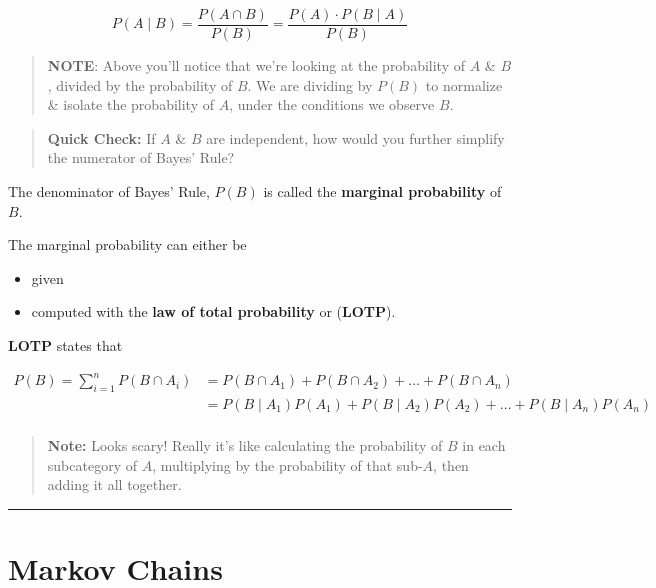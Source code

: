 \documentclass[
]{book}
\providecommand{\tightlist}{%
  \setlength{\itemsep}{0pt}\setlength{\parskip}{0pt}}
\begin{document}
\[P(A \mid B) = \frac{P(A \cap B)}{P(B)}=\frac{P(A)\cdot P(B \mid A)}{P(B)}\]

\begin{quote}
\textbf{NOTE}: Above you'll notice that we're looking at the probability of \(A\) \& \(B\), divided by the probability of \(B\). We are dividing by \(P(B)\) to normalize \& isolate the probability of \(A\), under the conditions we observe \(B\).
\end{quote}

\begin{quote}
\textbf{Quick Check:} If \(A\) \& \(B\) are independent, how would you further simplify the numerator of Bayes' Rule?
\end{quote}

The denominator of Bayes' Rule, \(P(B)\) is called the \textbf{marginal probability} of \(B\).

The marginal probability can either be

\begin{itemize}
\tightlist
\item
  given
\item
  computed with the \textbf{law of total probability} or (\textbf{LOTP}).
\end{itemize}

\textbf{LOTP} states that

\begin{align*}
P(B) = \sum_{i=1}^n P(B \cap A_i) &= P(B \cap A_1) + P(B\cap A_2) + \dots + P(B\cap A_n) \\
&= P(B \mid A_1)P(A_1) + P(B\mid A_2)P(A_2) + \dots + P(B\mid A_n)P(A_n) \\
\end{align*}

\begin{quote}
\textbf{Note:} Looks scary! Really it's like calculating the probability of \(B\) in each subcategory of \(A\), multiplying by the probability of that sub-\(A\), then adding it all together.
\end{quote}

\hfill\break

\begin{center}\rule{0.5\linewidth}{0.5pt}\end{center}

\hypertarget{markov-chains}{%
\section{Markov Chains}\label{markov-chains}}
\end{document}
